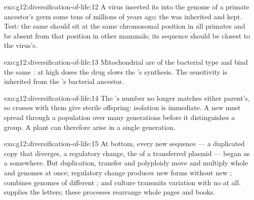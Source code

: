 \begin{solution}{exo:g12:diversification-of-life:12}
A virus inserted its  into the genome of a primate ancestor's
germ  some tens of millions of years ago; the  was inherited
and kept. Test: the same  should sit at the same chromosomal
position in all primates and be absent from that position in other
mammals; its sequence should be closest to the virus's.
\end{solution}

\begin{solution}{exo:g12:diversification-of-life:13}
Mitochondrial  are of the bacterial type and bind the same
: at high doses the drug slows the 's 
synthesis. The sensitivity is inherited from the 's
bacterial ancestor.
\end{solution}

\begin{solution}{exo:g12:diversification-of-life:14}
The 's  number no longer matches either parent's,
so crosses with them give sterile offspring: isolation is immediate. A
new  must spread through a population over many generations
before it distinguishes a group. A plant  can therefore arise
in a single generation.
\end{solution}

\begin{solution}{exo:g12:diversification-of-life:15}
At bottom, every new sequence --- a duplicated copy that diverges, a
regulatory change, the  of a transferred plasmid --- began as a
 somewhere. But duplication, transfer and polyploidy move and
multiply whole  and genomes at once; regulatory change produces
new forms without new ;  combines genomes of
different ; and culture transmits variation with no  at
all.  supplies the letters; these processes rearrange whole
pages and books.
\end{solution}

